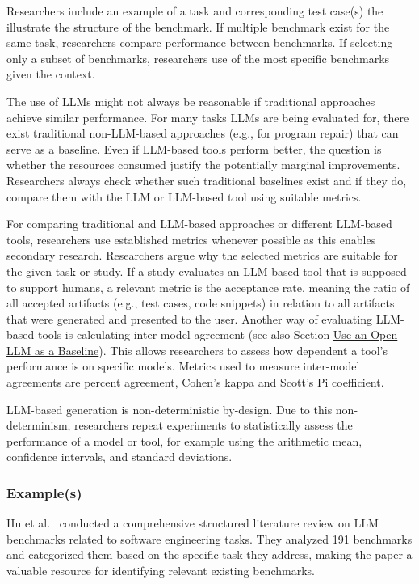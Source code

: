 Researchers \may include an example of a task and corresponding test case(s) the illustrate the structure of the benchmark.
If multiple benchmark exist for the same task, researchers \should compare performance between benchmarks.
If selecting only a subset of benchmarks, researchers \should use of the most specific benchmarks given the context.

The use of LLMs might not always be reasonable if traditional approaches achieve similar performance. 
For many tasks LLMs are being evaluated for, there exist traditional non-LLM-based approaches (e.g., for program repair) that can serve as a baseline.
Even if LLM-based tools perform better, the question is whether the resources consumed justify the potentially marginal improvements.
Researchers \should always check whether such traditional baselines exist and if they do, compare them with the LLM or LLM-based tool using suitable metrics.

For comparing traditional and LLM-based approaches or different LLM-based tools, researchers \should use established metrics whenever possible as this enables secondary research.
Researchers \must argue why the selected metrics are suitable for the given task or study. 
If a study evaluates an LLM-based tool that is supposed to support humans, a relevant metric is the acceptance rate, meaning the ratio of all accepted artifacts (e.g., test cases, code snippets) in relation to all artifacts that were generated and presented to the user.
Another way of evaluating LLM-based tools is calculating inter-model agreement (see also Section \href{/guidelines/#use-an-open-llm-as-a-baseline}{Use an Open LLM as a Baseline}).
This allows researchers to assess how dependent a tool's performance is on specific models.
Metrics used to measure inter-model agreements are percent agreement, Cohen's kappa and Scott's Pi coefficient.

LLM-based generation is non-deterministic by-design.
Due to this non-determinism, researchers \should repeat experiments to statistically assess the performance of a model or tool, for example using the arithmetic mean, confidence intervals, and standard deviations.


\subsubsection{Example(s)}

Hu et al.~\citet{hu2025assessingadvancingbenchmarksevaluating} conducted a comprehensive structured literature review on LLM benchmarks related to software engineering tasks.
They analyzed 191 benchmarks and categorized them based on the specific task they address, making the paper a valuable resource for identifying relevant existing benchmarks.

